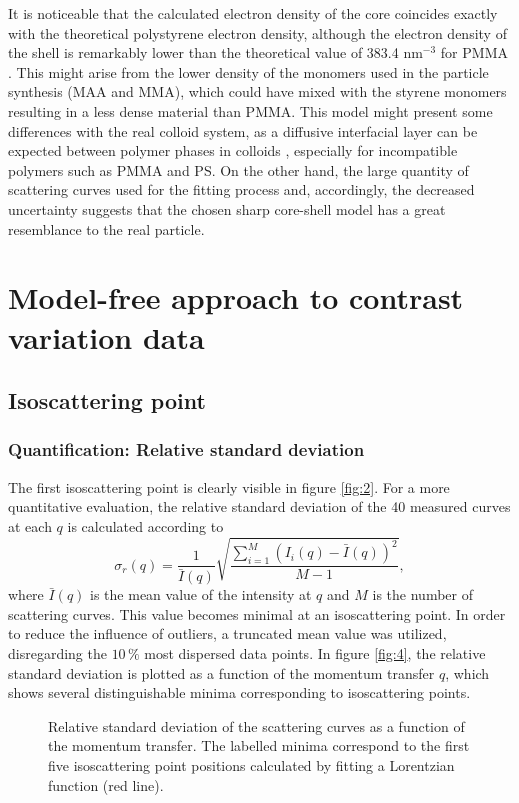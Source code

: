 It is noticeable that the calculated electron density of the core coincides exactly with the theoretical polystyrene electron density, although the electron density of the shell is remarkably lower than the theoretical value of 383.4 nm\(^{-3}\) for PMMA \citet{ballauff_saxs_2001-1}. This might arise from the lower density of the monomers used in the particle synthesis (MAA and MMA), which could have mixed with the styrene monomers resulting in a less dense material than PMMA. This model might present some differences with the real colloid system, as a diffusive interfacial layer can be expected between polymer phases in colloids \citet{dingenouts_interface_1994}, especially for incompatible polymers such as PMMA and PS. On the other hand, the large quantity of scattering curves used for the fitting process and, accordingly, the decreased uncertainty suggests that the chosen sharp core-shell model has a great resemblance to the real particle.

\section{Model-free approach to contrast variation data}
\subsection{Isoscattering point}
\subsubsection{Quantification: Relative standard deviation}
The first isoscattering point is clearly visible in figure \ref{fig:2}. For a more quantitative evaluation, the relative standard deviation of the 40 measured curves at each \(q\) is calculated according to
\begin{equation}
\sigma_r (q)=\frac{1}{\bar{I}(q)}\sqrt{\frac{\sum^{M}_{i=1} (I_i(q) -\bar{I} (q))^2 }{M-1}} ,
\end{equation}
where \(\bar{I} (q)\) is the mean value of the intensity at \(q\) and \( M \) is the number of scattering curves. This value becomes minimal at an isoscattering point. In order to reduce the influence of outliers, a truncated mean value was utilized, disregarding the \(10\,\%\) most dispersed data points. In figure \ref{fig:4}, the relative standard deviation is plotted as a function of the momentum transfer \(q\), which shows several distinguishable minima corresponding to isoscattering points.

\begin{figure}%
	\centering
		
		\caption{Relative standard deviation of the scattering curves as a function of the momentum transfer. The labelled minima correspond to the first five isoscattering point positions calculated by fitting a Lorentzian function (red line).}
		\label{fig:KiskerIsopoint}
\end{figure}


